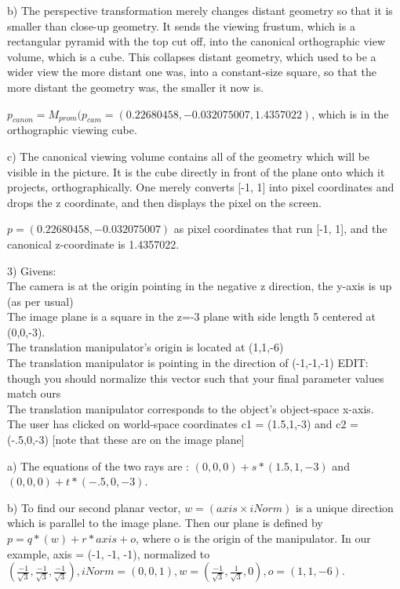 \documentclass{letter}
\begin{document}
b) The perspective transformation merely changes distant geometry so that it is smaller than close-up geometry. It sends the viewing frustum, which is a rectangular pyramid with the top cut off, into the canonical orthographic view volume, which is a cube. This collapses distant geometry, which used to be a wider view the more distant one was, into a constant-size square, so that the more distant the geometry was, the smaller it now is. 

$p_{canon} = M_{prom}(p_{cam} = ({0.22680458, -0.032075007, 1.4357022})$, which is in the orthographic viewing cube. 

c) The canonical viewing volume contains all of the geometry which will be visible in the picture. It is the cube directly in front of the plane onto which it projects, orthographically. One merely converts [-1, 1] into pixel coordinates and drops the z coordinate, and then displays the pixel on the screen. 

$p = (0.22680458, -0.032075007)$ as pixel coordinates that run [-1, 1], and the canonical z-coordinate is 1.4357022.

3)
Givens:
\\The camera is at the origin pointing in the negative z direction, the y-axis is up (as per usual)
\\The image plane is a square in the z=-3 plane with side length 5 centered at (0,0,-3).
\\The translation manipulator's origin is located at (1,1,-6)
\\The translation manipulator is pointing in the direction of (-1,-1,-1) EDIT: though you should normalize this vector such that your 
final parameter values match ours
\\The translation manipulator corresponds to the object's object-space x-axis.
\\The user has clicked on world-space coordinates c1 = (1.5,1,-3) and c2 = (-.5,0,-3) [note that these are on the image plane]

a) The equations of the two rays are : $(0, 0, 0) + s*(1.5, 1, -3)$  and $(0, 0, 0) + t * (-.5, 0, -3) $.

b) To find our second planar vector, $w= (axis \times  iNorm)$ is a unique direction which is parallel to the image plane. Then our plane is defined by $p = q * (w) + r * axis + o$, where o is the origin of the manipulator. In our example, axis = (-1, -1, -1), normalized to $(\frac{-1}{\sqrt{3}}, \frac{-1}{\sqrt{3}}, \frac{-1}{\sqrt{3}}), iNorm = (0, 0, 1), w = (\frac{-1}{\sqrt{3}}, \frac{1}{\sqrt{3}}, 0), o = (1, 1, -6)$. 
\end{document}
